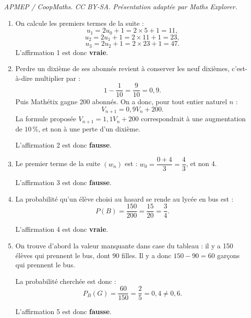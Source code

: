 \documentclass[10pt]{article}
\begin{document}
\noindent\textit{APMEP / CoopMaths. CC BY-SA. Présentation adaptée par Maths Explorer.}\par\medskip
\begin{enumerate}
\item On calcule les premiers termes de la suite :
\[
u_1=2u_0+1=2\times 5+1=11,
\]
\[
u_2=2u_1+1=2\times 11+1=23,
\]
\[
u_3=2u_2+1=2\times 23+1=47.
\]
L'affirmation 1 est donc \textbf{vraie}.

\bigskip

\item Perdre un dixième de ses abonnés revient à conserver les neuf dixièmes, c'est-à-dire multiplier par :
\[
1-\dfrac{1}{10}=\dfrac{9}{10}=0{,}9.
\]
Puis Mathétix gagne 200 abonnés. On a donc, pour tout entier naturel $n$ :
\[
V_{n+1}=0{,}9V_n+200.
\]
La formule proposée $V_{n+1}=1{,}1V_n+200$ correspondrait à une augmentation de $10\,\%$, et non à une perte d'un dixième.

L'affirmation 2 est donc \textbf{fausse}.

\bigskip

\item Le premier terme de la suite $(w_n)$ est : $w_0=\dfrac{0+4}{3}=\dfrac{4}{3}$, et non 4.

L'affirmation 3 est donc \textbf{fausse}.

\bigskip

\item La probabilité qu'un élève choisi au hasard se rende au lycée en bus est :
\[P(B)=\dfrac{150}{200}=\dfrac{15}{20}=\dfrac{3}{4}.\]

L'affirmation 4 est donc \textbf{vraie}.

\bigskip

\item On trouve d'abord la valeur manquante dans case du tableau : il y a 150 élèves qui prennent le bus, dont 90 filles. Il y a donc $150-90=60$ garçons qui prennent le bus.

La probabilité cherchée est donc :
\[P_B(G)=\dfrac{60}{150}=\dfrac{2}{5}=0{,}4\neq0{,}6.\]

L'affirmation 5 est donc \textbf{fausse}.
\end{enumerate}
\end{document}
